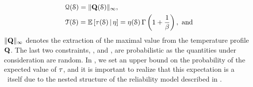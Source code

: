 \begin{align*}
  & \qoiQ(\schedule) = \norm[\infty]{\mQ(\schedule)}, \\
  & \qoiT(\schedule) = \expectation{\T(\schedule) \, | \, \eta} = \eta(\schedule) \, \Gamma\left(1 + \frac{1}{\beta}\right), \text{ and}
\end{align*}
$\norm[\infty]{\mQ}$ denotes the extraction of the maximal value from the temperature profile $\mQ$.
The last two constraints, \ie,  and , are probabilistic as the quantities under consideration are random.
In , we set an upper bound on the probability of the expected value of $\T$, and it is important to realize that this expectation is a \rv\ itself due to the nested structure of the reliability model described in .
